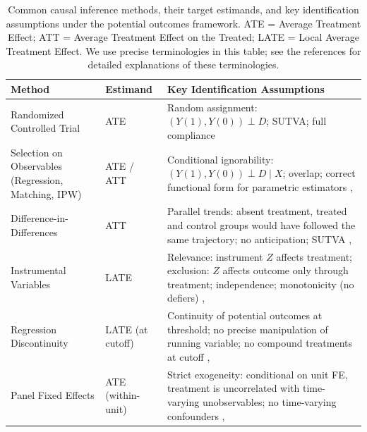 \begin{table}[t]
\centering
\caption{Common causal inference methods, their target estimands, and key identification assumptions under the potential outcomes framework.
ATE = Average Treatment Effect; ATT = Average Treatment Effect on the Treated; LATE = Local Average Treatment Effect.
We use precise terminologies in this table; see the references for detailed explanations of these terminologies.}
\label{tab:methods-summary}
\footnotesize
\begin{tabularx}{\linewidth}{@{} p{3.2cm} p{1.6cm} X @{}}
\toprule
\textbf{Method} & \textbf{Estimand} & \textbf{Key Identification Assumptions} \\
\midrule
Randomized Controlled Trial
  & ATE
  & Random assignment: $(Y(1), Y(0)) \perp D$; SUTVA; full compliance \cite[Ch.~4]{cunningham2021causal} \\
\addlinespace
Selection on Observables {\scriptsize (Regression, Matching, IPW)}
  & ATE / ATT
  & Conditional ignorability: $(Y(1), Y(0)) \perp D \mid X$; overlap; correct functional form for parametric estimators \cite[Ch.~3]{angrist2009mostly}, \cite[Ch.~5]{cunningham2021causal} \\
\addlinespace
Difference-in-Differences
  & ATT
  & Parallel trends: absent treatment, treated and control groups would have followed the same trajectory; no anticipation; SUTVA \cite[Ch.~5]{angrist2009mostly}, \cite[Ch.~9]{cunningham2021causal} \\
\addlinespace
Instrumental Variables
  & LATE
  & Relevance: instrument $Z$ affects treatment; exclusion: $Z$ affects outcome only through treatment; independence; monotonicity (no defiers) \cite[Ch.~4]{angrist2009mostly}, \cite[Ch.~7]{cunningham2021causal} \\
\addlinespace
Regression Discontinuity
  & LATE \scriptsize{(at cutoff)}
  & Continuity of potential outcomes at threshold; no precise manipulation of running variable; no compound treatments at cutoff \cite[Ch.~6]{angrist2009mostly}, \cite[Ch.~6]{cunningham2021causal} \\
\addlinespace
Panel Fixed Effects
  & ATE \scriptsize{(within-unit)}
  & Strict exogeneity: conditional on unit FE, treatment is uncorrelated with time-varying unobservables; no time-varying confounders \cite[Ch.~5]{angrist2009mostly}, \cite[Ch.~8]{cunningham2021causal} \\
\bottomrule
\end{tabularx}
\end{table}

